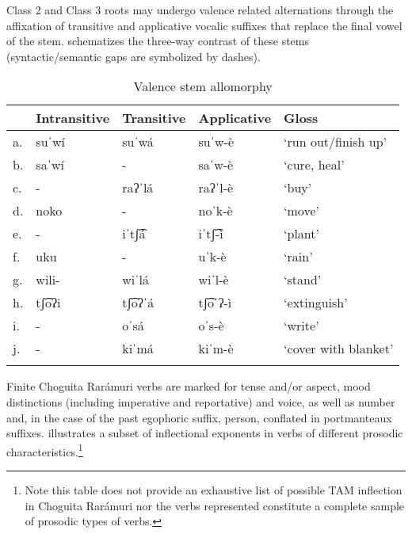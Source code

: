 Class 2 and Class 3 roots may undergo valence related alternations through the affixation of transitive and applicative vocalic suffixes that replace the final vowel of the stem.  schematizes the three-way contrast of these stems (syntactic/semantic gaps are symbolized by dashes).


\begin{table}
\caption{Valence stem allomorphy}
\label{tab:valence-allomorphy}

\begin{tabularx}{.9\textwidth}{llllQ}
\lsptoprule
& \textbf{Intransitive}  &   \textbf{Transitive} &  \textbf{Applicative } &     \textbf{Gloss}\\
\midrule
a. & suˈwí    & suˈwá     &     suˈw-è &                  ‘run out/finish up’\\
b. & saˈwí          &   - &                 saˈw-è &                  ‘cure, heal’\\
c. &  - &               raʔˈlá      &       raʔˈl-è &                   ‘buy'\\
d. &  noko      &      - &                noˈk-è      &            ‘move’\\
e. &   - &              iˈtʃ͡á      &        iˈtʃ͡-ì  &                   ‘plant'\\
f. &  uku  &             - &                uˈk-è     &             ‘rain'\\
g. & wili-  &             wiˈlá  &         wiˈl-è      &            ‘stand’\\
h. & tʃ͡oʔi  &             tʃ͡oʔˈá &           tʃ͡oˈʔ-ì &                   ‘extinguish’\\
i. &  -     &               oˈsá &           oˈs-è     &               ‘write’\\
j. &  -      &              kiˈmá  &         kiˈm-è     &            ‘cover with blanket’\\
\lspbottomrule
\end{tabularx}
\end{table}

Finite Choguita Rarámuri verbs are marked for tense and/or aspect, mood distinctions (including imperative and reportative) and voice, as well as number and, in the case of the past egophoric suffix, person, conflated in portmanteaux suffixes.  illustrates a subset of inflectional exponents in verbs of different prosodic characteristics.\footnote{Note this table does not provide an exhaustive list of possible TAM inflection in Choguita Rarámuri nor the verbs represented constitute a complete sample of prosodic types of verbs.}

